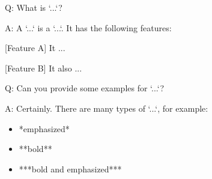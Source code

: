 Q:
  What is `...`?

A:
  A `...` is a `...`. It has the following features:

  [Feature A]
  It ...

  [Feature B]
  It also ...

Q:
  Can you provide some examples for `...`?

A:
  Certainly. There are many types of `...`, for example:
  \begin{itemize}
    \item *emphasized*
    \item **bold**
    \item ***bold and emphasized***
  \end{itemize}
